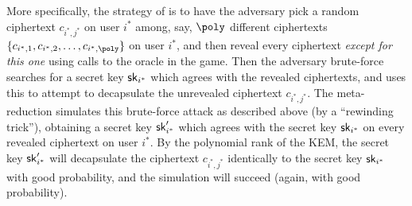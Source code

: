 More specifically, the strategy of \cite{AC:HanLiuGu21}
is to have the adversary \advA pick a random ciphertext
\(c_{i^{*},j^{*}}\) on user \(i^{*}\) among, say, \(\poly\)
different ciphertexts
\(\{c_{i^{*},1},c_{i^{*},2},\ldots,c_{i^{*},\poly}\}\)
on user \(i^{*}\),
and then reveal every ciphertext \emph{except for this one}
using calls to the \Reveal oracle in the \ECPA game.
Then the adversary brute-force searches for a secret key \(\mathsf{sk}_{i^{*}}\)
which agrees with the revealed ciphertexts,
and uses this to attempt to decapsulate the unrevealed ciphertext \(c_{i^{*},j^{*}}\).
The meta-reduction simulates this brute-force attack
as described above (by a ``rewinding trick''),
obtaining a secret key \(\mathsf{sk}_{i^{*}}'\)
which agrees with the secret key \(\mathsf{sk}_{i^{*}}\)
on every revealed ciphertext on user \(i^{*}\).
By the polynomial rank of the KEM,
the secret key \(\mathsf{sk}_{i^{*}}'\)
will decapsulate the ciphertext \(c_{i^{*},j^{*}}\)
identically to the secret key \(\mathsf{sk}_{i^{*}}\) with good probability,
and the simulation will succeed (again, with good probability).


